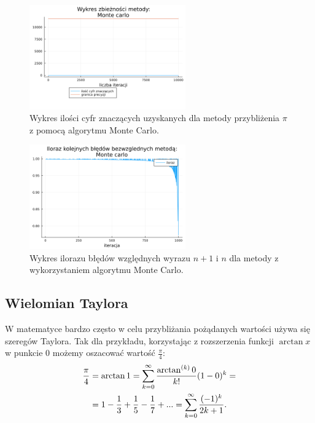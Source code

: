 \begin{figure}[!h]\centering
\renewcommand{\figurename}{Wykres}
\includegraphics[width=0.6\textwidth]{../prog/monte_carlo_log_error.png}
\caption{Wykres ilości cyfr znaczących uzyskanych dla metody przybliżenia $\pi$ z pomocą algorytmu Monte Carlo.}
\label{monte-carlo-error}
\end{figure}

\begin{figure}[!h]\centering
    \renewcommand{\figurename}{Wykres}
    \includegraphics[width=0.6\textwidth]{../prog/monte_carlo_error_ratio.png}
    \caption{Wykres ilorazu błędów względnych wyrazu $n+1$ i $n$ dla metody z wykorzystaniem algorytmu Monte Carlo.}
    \label{monte-carlo-convergence}
\end{figure}


\subsection{Wielomian Taylora}
W matematyce bardzo często w celu przybliżania pożądanych wartości używa się szeregów Taylora. Tak dla przykładu, korzystając z rozszerzenia funkcji $\arctan x$ w punkcie $0$ możemy oszacować wartość $\frac\pi4$:
\begin{equation}
\begin{split}
    \frac\pi4&=\arctan1=\sum\limits_{k=0}^\infty{\arctan^{(k)}0\over k!}(1-0)^k=\\
    &=1-\frac13+\frac15-\frac17+...=\sum\limits_{k=0}^\infty{(-1)^k\over 2k+1}.
\end{split}
\end{equation}

